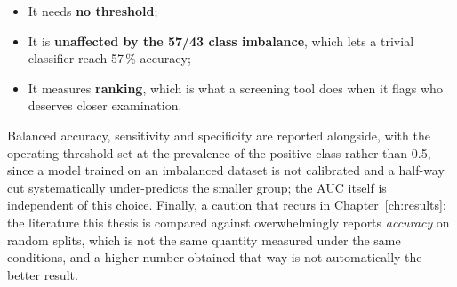 \begin{itemize}
  \item It needs \textbf{no threshold};
  \item It is \textbf{unaffected by the 57/43 class imbalance}, which lets a
        trivial classifier reach 57\,\% accuracy;
  \item It measures \textbf{ranking}, which is what a screening tool does
        when it flags who deserves closer examination.
\end{itemize}

Balanced accuracy, sensitivity and specificity are reported alongside, with
the operating threshold set at the prevalence of the positive class rather
than 0.5, since a model trained on an imbalanced dataset is not calibrated and
a half-way cut systematically under-predicts the smaller group; the AUC
itself is independent of this choice. Finally, a caution that recurs in
Chapter~\ref{ch:results}: the literature this thesis is compared against overwhelmingly
reports \emph{accuracy} on random splits, which is not the same quantity
measured under the same conditions, and a higher number obtained that way is
not automatically the better result.
